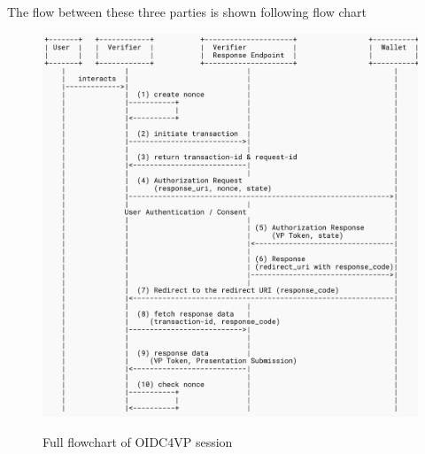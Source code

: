 \documentclass[
	a4paper               %
	,BCOR=0mm            %
	,bibliography=totoc   %
	,listof=totoc         %
	,monolingual
	,twoside=false
]{bfhthesis}              %
\begin{document}
The flow between these three parties is shown following flow chart
\begin{figure}[h]
	\centering
	\includegraphics[width=12cm]{./img/oidc4vpflowextended.png}
	\label{fig:flowoid}
	\caption{Full flowchart of OIDC4VP session}
\end{figure}
\end{document}
